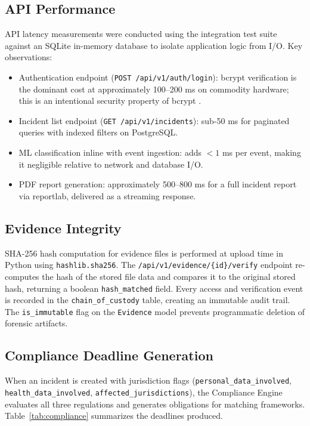 \documentclass[conference]{IEEEtran}
\begin{document}
\subsection{API Performance}

API latency measurements were conducted using the integration test suite against an SQLite in-memory database to isolate application logic from I/O. Key observations:

\begin{itemize}
    \item Authentication endpoint (\texttt{POST /api/v1/auth/login}): bcrypt verification is the dominant cost at approximately 100--200 ms on commodity hardware; this is an intentional security property of bcrypt \cite{provos1999bcrypt}.
    \item Incident list endpoint (\texttt{GET /api/v1/incidents}): sub-50 ms for paginated queries with indexed filters on PostgreSQL.
    \item ML classification inline with event ingestion: adds $<1$ ms per event, making it negligible relative to network and database I/O.
    \item PDF report generation: approximately 500--800 ms for a full incident report via reportlab, delivered as a streaming response.
\end{itemize}

\subsection{Evidence Integrity}

SHA-256 hash computation for evidence files is performed at upload time in Python using \texttt{hashlib.sha256}. The \texttt{/api/v1/evidence/\{id\}/verify} endpoint re-computes the hash of the stored file data and compares it to the original stored hash, returning a boolean \texttt{hash\_matched} field. Every access and verification event is recorded in the \texttt{chain\_of\_custody} table, creating an immutable audit trail. The \texttt{is\_immutable} flag on the \texttt{Evidence} model prevents programmatic deletion of forensic artifacts.

\subsection{Compliance Deadline Generation}

When an incident is created with jurisdiction flags (\texttt{personal\_data\_involved}, \texttt{health\_data\_involved}, \texttt{affected\_jurisdictions}), the Compliance Engine evaluates all three regulations and generates obligations for matching frameworks. Table~\ref{tab:compliance} summarizes the deadlines produced.
\end{document}
